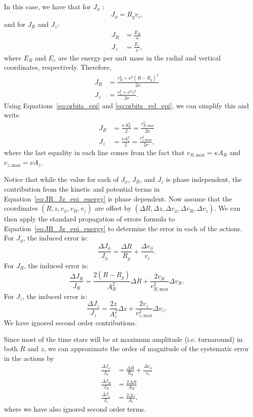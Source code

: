\documentclass[twocolumn]{aastex62}
\newcommand{\beq}{\begin{equation}}
\newcommand{\eeq}{\end{equation}}
\begin{document}
In this case, we have that for $J_{\phi}$
\citep[][Section~3.5.3b]{2008gady.book.....B}:
\beq\label{eq:Jphi_epi}
J_{\phi} = R_g v_c\text{,}
\eeq
and for $J_R$ and $J_z$:
\beq\label{eq:JR_Jz_epi}
\begin{split}
J_R &= \frac{E_R}{\kappa} \\
J_z &= \frac{E_z}{\nu} \text{,}
\end{split}
\eeq
where $E_R$ and $E_z$ are the energy per unit mass in the radial and vertical
coordinates, respectively. Therefore,
\beq\label{eq:JR_Jz_epi_energy}
\begin{split}
J_R &= \frac{v_R^2 + \kappa^2 (R-R_g)^2}{2\kappa} \\
J_z &= \frac{v_z^2 + \nu^2 z^2}{2\nu}\text{.}
\end{split}
\eeq
Using Equations~\eqref{eq:orbits_epi} and \eqref{eq:orbits_vel_epi}, we can
simplify this and write
\beq\label{eq:JR_Jz_epi_final}
\begin{split}
J_R &= \frac{\kappa A_R^2}{2} = \frac{v_{R,\text{max}}^2}{2\kappa} \\
J_z &= \frac{\nu A_z^2}{2} = \frac{v_{z,\text{max}}^2}{2\nu}\text{,}
\end{split}
\eeq
where the last equality in each line comes from the fact that
$v_{R,\text{max}} = \kappa A_R$ and $v_{z,\text{max}} = \nu A_z$.

Notice that while the value for each of $J_{\phi}$, $J_R$, and $J_z$ is phase
independent, the contribution from the kinetic and potential terms in
Equation~\eqref{eq:JR_Jz_epi_energy} is phase dependent. Now assume that the
coordinates $(R, z, v_{\phi}, v_R, v_z)$ are offset by $(\Delta R, \Delta z,
\Delta v_{\phi}, \Delta v_R, \Delta v_z)$. We can then apply the standard
propagation of errors formula to Equation~\eqref{eq:JR_Jz_epi_energy} to
determine the error in each of the actions. For $J_{\phi}$, the induced error
is:
\beq\label{eq:induced_Jphi}
\frac{\Delta J_{\phi}}{J_{\phi}} = \frac{\Delta R}{R_g} 
                                    + \frac{\Delta v_{\phi}}{v_c}\text{.}
\eeq
For $J_R$, the induced error is:
\beq\label{eq:induced_JR}
\frac{\Delta J_R}{J_R} = \frac{2(R-R_g)}{A_R^2}\Delta R
                         + \frac{2v_R}{v_{R,\text{max}}^2} \Delta v_R \text{.}
\eeq
For $J_z$, the induced error is:
\beq\label{eq:induced_Jz}
\frac{\Delta J_z}{J_z} = \frac{2z}{A_z^2}\Delta z
                         + \frac{2v_z}{v_{z,\text{max}}^2} \Delta v_z \text{.}
\eeq
We have ignored second order contributions.

Since most of the time stars will be at maximum amplitude (i.e. turnaround) in
both $R$ and $z$, we can approximate the order of magnitude of the systematic
error in the actions by
\beq\label{eq:Ji_err_mosttime}
\begin{split}
\frac{\Delta J_{\phi}}{J_{\phi}} &= \frac{\Delta R}{R_g} 
                                    + \frac{\Delta v_{\phi}}{v_c} \\
\frac{\Delta J_{R}}{J_{R}} &= \frac{2\Delta R}{A_R} \\
\frac{\Delta J_{z}}{J_{z}} &= \frac{2\Delta z}{A_z} \text{,}
\end{split}
\eeq
where we have also ignored second order terms.
\end{document}
